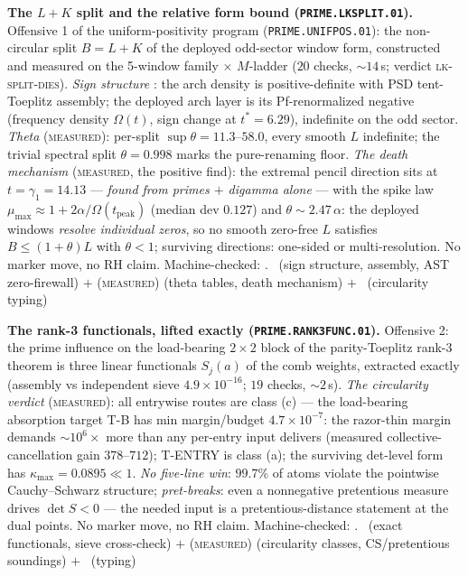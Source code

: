 \par\smallskip\noindent\textbf{The $L+K$ split and the relative form
bound (\texttt{PRIME.LKSPLIT.01}).}
Offensive 1 of the uniform-positivity program
(\texttt{PRIME.UNIFPOS.01}): the non-circular split $B=L+K$ of the
deployed odd-sector window form, constructed and measured on the
5-window family $\times$ $M$-ladder ($20$ checks, ${\sim}14$\,s;
verdict \textsc{lk-split-dies}).  \emph{Sign structure} \mE: the arch
density is positive-definite with PSD tent-Toeplitz assembly; the
deployed arch layer is its Pf-renormalized negative (frequency
density $\Omega(t)$, sign change at $t^*=6.29$), indefinite on the
odd sector.  \emph{Theta} (\textsc{measured}): per-split
$\sup\theta=11.3$--$58.0$, every smooth $L$ indefinite; the trivial
spectral split $\theta=0.998$ marks the pure-renaming floor.
\emph{The death mechanism} (\textsc{measured}, the positive find):
the extremal pencil direction sits at $t=\gamma_1=14.13$ ---
\emph{found from primes $+$ digamma alone} --- with the spike law
$\mu_{\max}\approx1+2\alpha/\Omega(t_{\mathrm{peak}})$ (median dev
$0.127$) and $\theta\sim2.47\,\alpha$: the deployed windows
\emph{resolve individual zeros}, so no smooth zero-free $L$
satisfies $B\le(1+\theta)L$ with $\theta<1$; surviving directions:
one-sided or multi-resolution.  No marker move, no RH claim.
Machine-checked: .
\mE\ (sign structure, assembly, AST zero-firewall) $+$
(\textsc{measured}) (theta tables, death mechanism) $+$ \mC\
(circularity typing)
\par\smallskip


\par\smallskip\noindent\textbf{The rank-3 functionals, lifted exactly
(\texttt{PRIME.RANK3FUNC.01}).}
Offensive 2: the prime influence on the load-bearing $2\times2$ block
of the parity-Toeplitz rank-3 theorem is three linear functionals
$S_j(a)$ of the comb weights, extracted exactly (assembly vs
independent sieve $4.9\times10^{-16}$; $19$ checks, ${\sim}2$\,s).
\emph{The circularity verdict} (\textsc{measured}): all entrywise
routes are class (c) --- the load-bearing absorption target T-B has
min margin/budget $4.7\times10^{-7}$: the razor-thin margin demands
$\sim10^{6}\times$ more than any per-entry input delivers (measured
collective-cancellation gain $378$--$712$); T-ENTRY is class (a); the
surviving det-level form has $\kappa_{\max}=0.0895\ll1$.  \emph{No
five-line win}: $99.7\%$ of atoms violate the pointwise
Cauchy--Schwarz structure; \emph{pret-breaks}: even a nonnegative
pretentious measure drives $\det S<0$ --- the needed input is a
pretentious-distance statement at the dual points.  No marker move,
no RH claim.
Machine-checked: .
\mE\ (exact functionals, sieve cross-check) $+$ (\textsc{measured})
(circularity classes, CS/pretentious soundings) $+$ \mC\ (typing)
\par\smallskip


